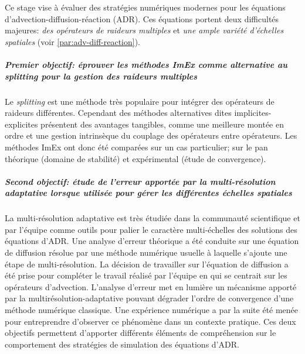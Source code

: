 Ce stage vise à évaluer des stratégies numériques modernes pour les équations d'advection-diffusion-réaction (ADR).
Ces équations portent deux difficultés majeures: \textit{des opérateurs de raideurs multiples} et \textit{une ample variété d'échelles spatiales} (voir \ref{par:adv-diff-reaction}).
\subparagraph{Premier objectif: éprouver les méthodes ImEx comme alternative au \textit{splitting} pour la gestion des raideurs multiples}
    Le \textit{splitting} est une méthode très populaire pour intégrer des opérateurs de raideurs différentes. 
    Cependant des méthodes alternatives dites implicites-explicites présentent des avantages tangibles, comme une meilleure montée en ordre et 
    une gestion intrinsèque du couplage des opérateurs entre opérateurs. 
    Les méthodes ImEx ont donc été comparées sur un cas particulier; sur le pan théorique (domaine de stabilité) et expérimental (étude de convergence).
\subparagraph{Second objectif: étude de l'erreur apportée par la multi-résolution adaptative lorsque utilisée pour gérer les différentes échelles spatiales}
    La multi-résolution adaptative est très étudiée dans la communauté scientifique et par l'équipe comme outils pour palier le caractère multi-échelles des solutions des équations d'ADR.
    Une analyse d'erreur théorique a été conduite sur une équation de diffusion résolue par une méthode numérique usuelle à laquelle s'ajoute une étape de multi-résolution.
    La décision de travailler sur l'équation de diffusion a été prise pour compléter le travail réalisé par l'équipe en \cite{belloti_et_al_2025} qui se centrait sur les opérateurs d'advection.
    L'analyse d'erreur met en lumière un mécanisme apporté par la multirésolution-adaptative pouvant dégrader l'ordre de convergence d'une méthode numérique classique.
    Une expérience numérique a par la suite été menée pour entreprendre d'observer ce phénomène dans un contexte pratique.
Ces deux objectifs permettent d'apporter différents éléments de compréhension sur le comportement des stratégies de simulation des équations d'ADR.